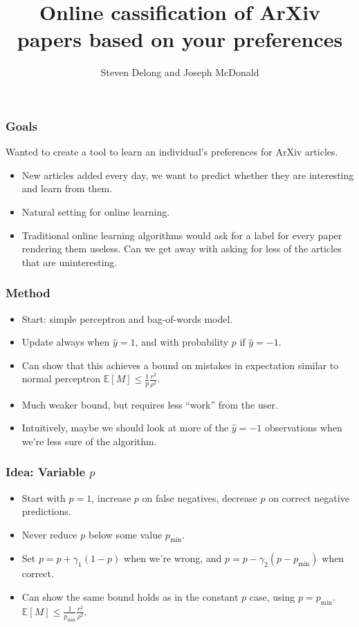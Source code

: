 \documentclass{beamer}
\title{Online cassification of ArXiv papers based on your preferences }
\author{Steven Delong and Joseph McDonald}
\begin{document}
\maketitle


\begin{frame}
  \frametitle{Goals}
  Wanted to create a tool to learn an individual's preferences for ArXiv articles.
\begin{itemize}
\item New articles added every day, we want to predict whether they are interesting and learn from them.
\item Natural setting for online learning.
\item Traditional online learning algorithms would ask for a label for every paper rendering them useless. Can we get away with asking for less of the articles that are uninteresting.
\end{itemize}


\end{frame}


\begin{frame}
\frametitle{Method}
\begin{itemize}
\item Start: simple perceptron and bag-of-words model.
\item Update always when  $\hat{y} = 1$, and with probability $p$ if $\hat{y} = -1$.
\item Can show that this achieves a bound on mistakes in expectation similar to normal perceptron $\mathbb{E}[M] \leq \frac{1}{p}\frac{r^2}{\rho^2}$.
\item Much weaker bound, but requires less ``work'' from the user.
\item Intuitively, maybe we should look at more of the $\hat{y} = -1$ observations when we're less sure of the algorithm.
\end{itemize}
\end{frame}

\begin{frame}
  \frametitle{Idea: Variable $p$}
 
\begin{itemize}
\item Start with $p = 1$, increase $p$ on false negatives, decrease $p$ on correct negative predictions.
\item Never reduce $p$ below some value $p_\min$. 
\item Set $p = p + \gamma_1(1 - p)$ when we're wrong, and $p = p - \gamma_2(p - p_\min)$ when correct.
\item Can show the same bound holds as in the constant $p$ case, using
  $p = p_\min$. $\mathbb{E}[M] \leq \frac{1}{p_{\min}}\frac{r^2}{\rho^2}$.
\end{itemize}
\end{frame}
\end{document}

